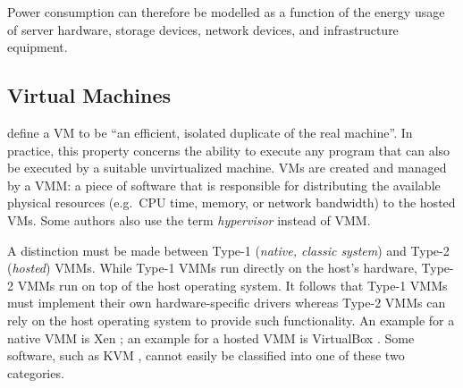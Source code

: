 \documentclass[12pt, a4paper]{scrartcl}
\begin{document}
Power consumption can therefore be modelled as a function of the energy usage of server hardware, storage devices, network devices, and infrastructure equipment.

\subsection{Virtual Machines}
\textcite{popek_vm_1974} define a \ac{VM} to be \enquote{an efficient, isolated duplicate of the real machine}.
In practice, this property concerns the ability to execute any program that can also be executed by a suitable unvirtualized machine.
\acp{VM} are created and managed by a \ac{VMM}: a piece of software that is responsible for distributing the available physical resources (e.g.\ CPU time, memory, or network bandwidth) to the hosted \acp{VM}.
Some authors also use the term \emph{hypervisor} instead of \ac{VMM}.

A distinction must be made between Type-1 (\emph{native, classic system}) and Type-2 (\emph{hosted}) \acp{VMM}.
While Type-1 \acp{VMM} run directly on the host's hardware, Type-2 \acp{VMM} run on top of the host operating system.
It follows that Type-1 \acp{VMM} must implement their own hardware-specific drivers whereas Type-2 \acp{VMM} can rely on the host operating system to provide such functionality.
An example for a native \ac{VMM} is Xen \cite{xen}; an example for a hosted \ac{VMM} is VirtualBox \cite{virtualbox}.
Some software, such as KVM \cite{kvm}, cannot easily be classified into one of these two categories.
\end{document}
